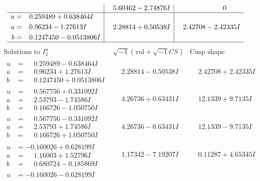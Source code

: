 \documentclass[1p]{elsarticle_modified}
\theoremstyle{definition}
\newcommand{\I}{\sqrt{-1}}
\begin{document}
$$\begin{array}{c|c|c}
 & \phantom{-}5.60462 - 2.74876 I & \phantom{-0.000000 } 0 \\ \hline\begin{aligned}
u &= \phantom{-}0.259489 + 0.638464 I \\
a &= \phantom{-}0.96234 - 1.27613 I \\
b &= \phantom{-}0.1247450 - 0.0513806 I\end{aligned}
 & \phantom{-}2.28814 + 0.50538 I & \phantom{-}2.42708 - 2.42335 I\\
 \hline 
 \end{array}$$\newpage$$\begin{array}{c|c|c}  
\text{Solutions to }I^u_{2}& \I (\text{vol} + \sqrt{-1}CS) & \text{Cusp shape}\\
 \hline 
\begin{aligned}
u &= \phantom{-}0.259489 - 0.638464 I \\
a &= \phantom{-}0.96234 + 1.27613 I \\
b &= \phantom{-}0.1247450 + 0.0513806 I\end{aligned}
 & \phantom{-}2.28814 - 0.50538 I & \phantom{-}2.42708 + 2.42335 I \\ \hline\begin{aligned}
u &= \phantom{-}0.567756 + 0.331092 I \\
a &= \phantom{-}2.53793 - 1.74586 I \\
b &= \phantom{-}0.166726 - 1.050750 I\end{aligned}
 & \phantom{-}4.26736 + 0.63431 I & \phantom{-}12.1339 + 9.7135 I \\ \hline\begin{aligned}
u &= \phantom{-}0.567756 - 0.331092 I \\
a &= \phantom{-}2.53793 + 1.74586 I \\
b &= \phantom{-}0.166726 + 1.050750 I\end{aligned}
 & \phantom{-}4.26736 - 0.63431 I & \phantom{-}12.1339 - 9.7135 I \\ \hline\begin{aligned}
u &= -0.160026 + 0.628199 I \\
a &= \phantom{-}1.16003 + 1.52796 I \\
b &= \phantom{-}0.680724 - 0.185869 I\end{aligned}
 & \phantom{-}1.17342 - 7.19207 I & \phantom{-}0.11287 + 4.65345 I \\ \hline\begin{aligned}
u &= -0.160026 - 0.628199 I \\

\end{aligned}
\end{array}$$
\end{document}

